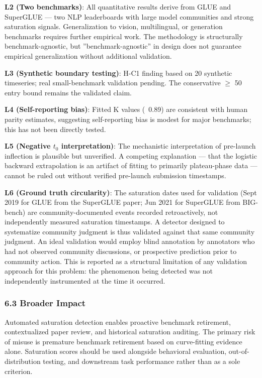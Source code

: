 \textbf{L2 (Two benchmarks)}: All quantitative results derive from GLUE and SuperGLUE --- two NLP leaderboards with large model communities and strong saturation signals. Generalization to vision, multilingual, or generation benchmarks requires further empirical work. The methodology is structurally benchmark-agnostic, but ''benchmark-agnostic'' in design does not guarantee empirical generalization without additional validation.

\textbf{L3 (Synthetic boundary testing)}: H-C1 finding based on 20 synthetic timeseries; real small-benchmark validation pending. The conservative $\geq$ 50 entry bound remains the validated claim.

\textbf{L4 (Self-reporting bias)}: Fitted K values (~0.89) are consistent with human parity estimates, suggesting self-reporting bias is modest for major benchmarks; this has not been directly tested.

\textbf{L5 (Negative $t_0$ interpretation)}: The mechanistic interpretation of pre-launch inflection is plausible but unverified. A competing explanation --- that the logistic backward extrapolation is an artifact of fitting to primarily plateau-phase data --- cannot be ruled out without verified pre-launch submission timestamps.

\textbf{L6 (Ground truth circularity)}: The saturation dates used for validation (Sept 2019 for GLUE from the SuperGLUE paper; Jun 2021 for SuperGLUE from BIG-bench) are community-documented events recorded retroactively, not independently measured saturation timestamps. A detector designed to systematize community judgment is thus validated against that same community judgment. An ideal validation would employ blind annotation by annotators who had not observed community discussions, or prospective prediction prior to community action. This is reported as a structural limitation of any validation approach for this problem: the phenomenon being detected was not independently instrumented at the time it occurred.

\subsubsection{6.3 Broader Impact}

Automated saturation detection enables proactive benchmark retirement, contextualized paper review, and historical saturation auditing. The primary risk of misuse is premature benchmark retirement based on curve-fitting evidence alone. Saturation scores should be used alongside behavioral evaluation, out-of-distribution testing, and downstream task performance rather than as a sole criterion.

